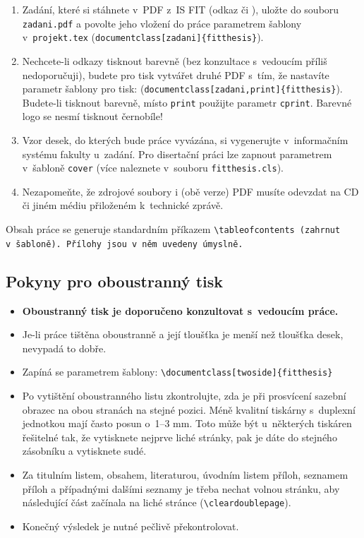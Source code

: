 \begin{enumerate}
  \item Zadání, které si stáhnete v~PDF z~IS FIT (odkaz  či ), uložte do souboru \texttt{zadani.pdf} a povolte jeho vložení do práce parametrem šablony v~\texttt{projekt.tex} (\verb|document|\verb|class[zadani]{fitthesis}|).
  \item Nechcete-li odkazy tisknout barevně (bez konzultace s~vedoucím příliš nedoporučuji), budete pro tisk vytvářet druhé PDF s~tím, že nastavíte parametr šablony pro tisk: (\verb|document|\verb|class[zadani,print]{fitthesis}|). Budete-li tisknout barevně, místo \texttt{print} použijte parametr \texttt{cprint}. Barevné logo se nesmí tisknout černobíle!
  \item Vzor desek, do kterých bude práce vyvázána, si vygenerujte v~informačním systému fakulty u~zadání. Pro disertační práci lze zapnout parametrem v~šabloně \texttt{cover} (více naleznete v~souboru \texttt{fitthesis.cls}).
  \item Nezapomeňte, že zdrojové soubory i (obě verze) PDF musíte odevzdat na CD či jiném médiu přiloženém k~technické zprávě.
\end{enumerate}

Obsah práce se generuje standardním příkazem \tt \textbackslash tableofcontents \rm (zahrnut v~šabloně). Přílohy jsou v~něm uvedeny úmyslně.

\subsection*{Pokyny pro oboustranný tisk}
\begin{itemize}
\item \textbf{Oboustranný tisk je doporučeno konzultovat s~vedoucím práce.}
\item Je-li práce tištěna oboustranně a její tloušťka je menší než tloušťka desek, nevypadá to dobře.
\item Zapíná se parametrem šablony: \verb|\document|\verb|class[twoside]{fitthesis}|
\item Po vytištění oboustranného listu zkontrolujte, zda je při prosvícení sazební obrazec na obou stranách na stejné pozici. Méně kvalitní tiskárny s~duplexní jednotkou mají často posun o~1--3 mm. Toto může být u~některých tiskáren řešitelné tak, že vytisknete nejprve liché stránky, pak je dáte do stejného zásobníku a vytisknete sudé.
\item Za titulním listem, obsahem, literaturou, úvodním listem příloh, seznamem příloh a případnými dalšími seznamy je třeba nechat volnou stránku, aby následující část začínala na liché stránce (\texttt{\textbackslash cleardoublepage}).
\item  Konečný výsledek je nutné pečlivě překontrolovat.
\end{itemize}

